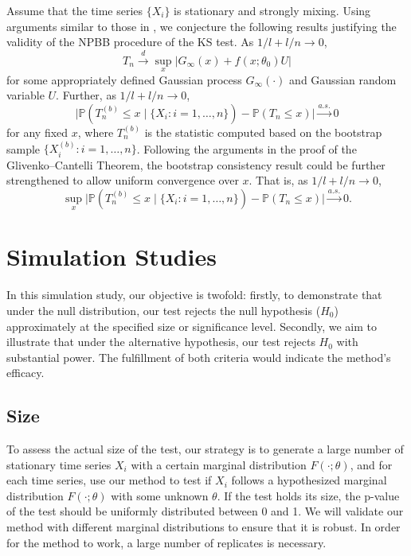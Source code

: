 \documentclass[APA,Times1COL]{WileyNJDv5} %
\begin{document}
Assume that the time series $\{X_i\}$ is stationary and
strongly mixing. Using arguments similar to those
in \citet{kunsch1989jackknife}, we conjecture the following results
justifying the validity of the NPBB procedure of the KS test.
As $1/l+l/n\rightarrow 0$,
\[
  T_n \overset{d}{\rightarrow}
  \sup_x \big\vert G_{\infty}(x)+f(x;\theta_0)U \big\vert
\]
for some appropriately defined Gaussian process $G_{\infty}(\cdot)$
and Gaussian random variable  $U$.
Further,  as $1/l+l/n\rightarrow 0$,
\[
  \big\vert \mathbb{P}(T_n^{(b)}\leq x \mid \{X_i: i = 1, \ldots, n\}) -
  \mathbb{P}(T_n\leq x) \big\vert
  \overset{a.s.}{\rightarrow} 0
\]
for any fixed $x$, where $T_n^{(b)}$ is the statistic computed 
based on the bootstrap sample $\{X_i^{(b)}: i = 1, \ldots, n\}$.
Following the arguments in the proof of the Glivenko--Cantelli
Theorem, the bootstrap consistency result could be further
strengthened to allow uniform convergence over $x$. That is,
as $1/l+l/n\rightarrow 0$,
\[
  \sup_x \big \vert
  \mathbb{P}(T_n^{(b)}\leq x \mid \{X_i: i = 1, \ldots, n\}) - \mathbb{P}(T_n\leq x) \big\vert
  \overset{a.s.}{\rightarrow} 0.
\]


\section{Simulation Studies}\label{sec:simu}

In this simulation study, our objective is twofold: firstly, to demonstrate that
under the null distribution, our test rejects the null hypothesis ($H_0$) 
approximately at the specified size or significance level. Secondly, we aim to
illustrate that under the alternative hypothesis, our test rejects
$H_0$ with substantial power. The fulfillment of both criteria would indicate
the method's efficacy.


\subsection{Size}
To assess the actual size of the test, our strategy is to
generate a large number of stationary time series $X_i$ with a certain marginal
distribution $F(\cdot; \theta)$, and for each time series, use our method to
test if $X_i$ follows a hypothesized marginal distribution $F(\cdot; \theta)$
with some unknown $\theta$. If the test holds its size, the p-value
of the test should be uniformly distributed between 0 and 1. We will validate
our method with different marginal distributions to ensure that it is robust.
In order for the method to work, a large number of replicates is necessary. 
\end{document}
